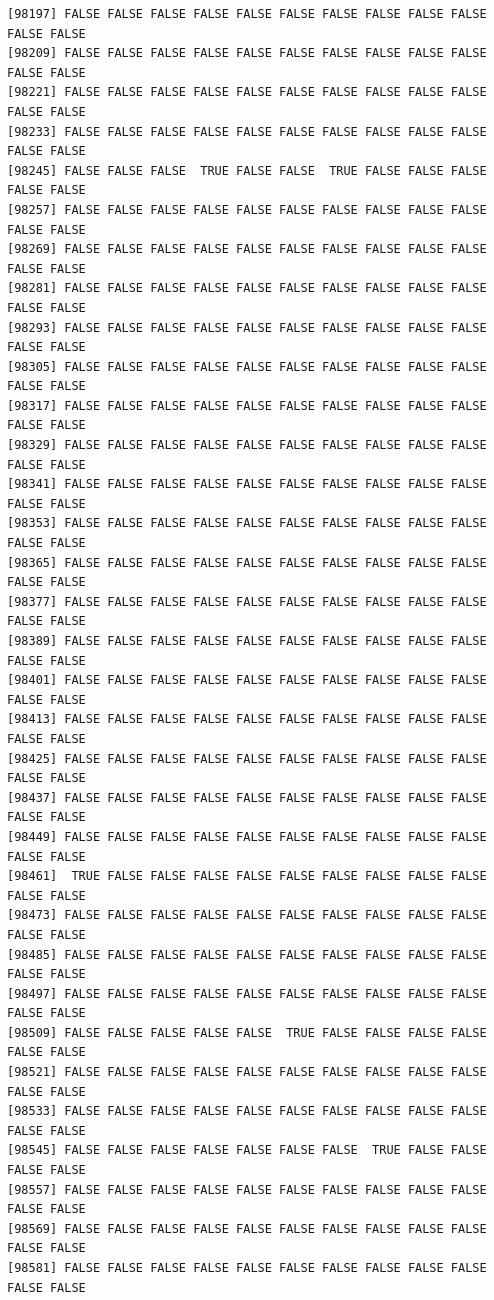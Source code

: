 \documentclass[
  a4paper,
  DIV=11,
  numbers=noendperiod]{scrartcl}
\begin{document}
\begin{verbatim}
[98197] FALSE FALSE FALSE FALSE FALSE FALSE FALSE FALSE FALSE FALSE FALSE FALSE
[98209] FALSE FALSE FALSE FALSE FALSE FALSE FALSE FALSE FALSE FALSE FALSE FALSE
[98221] FALSE FALSE FALSE FALSE FALSE FALSE FALSE FALSE FALSE FALSE FALSE FALSE
[98233] FALSE FALSE FALSE FALSE FALSE FALSE FALSE FALSE FALSE FALSE FALSE FALSE
[98245] FALSE FALSE FALSE  TRUE FALSE FALSE  TRUE FALSE FALSE FALSE FALSE FALSE
[98257] FALSE FALSE FALSE FALSE FALSE FALSE FALSE FALSE FALSE FALSE FALSE FALSE
[98269] FALSE FALSE FALSE FALSE FALSE FALSE FALSE FALSE FALSE FALSE FALSE FALSE
[98281] FALSE FALSE FALSE FALSE FALSE FALSE FALSE FALSE FALSE FALSE FALSE FALSE
[98293] FALSE FALSE FALSE FALSE FALSE FALSE FALSE FALSE FALSE FALSE FALSE FALSE
[98305] FALSE FALSE FALSE FALSE FALSE FALSE FALSE FALSE FALSE FALSE FALSE FALSE
[98317] FALSE FALSE FALSE FALSE FALSE FALSE FALSE FALSE FALSE FALSE FALSE FALSE
[98329] FALSE FALSE FALSE FALSE FALSE FALSE FALSE FALSE FALSE FALSE FALSE FALSE
[98341] FALSE FALSE FALSE FALSE FALSE FALSE FALSE FALSE FALSE FALSE FALSE FALSE
[98353] FALSE FALSE FALSE FALSE FALSE FALSE FALSE FALSE FALSE FALSE FALSE FALSE
[98365] FALSE FALSE FALSE FALSE FALSE FALSE FALSE FALSE FALSE FALSE FALSE FALSE
[98377] FALSE FALSE FALSE FALSE FALSE FALSE FALSE FALSE FALSE FALSE FALSE FALSE
[98389] FALSE FALSE FALSE FALSE FALSE FALSE FALSE FALSE FALSE FALSE FALSE FALSE
[98401] FALSE FALSE FALSE FALSE FALSE FALSE FALSE FALSE FALSE FALSE FALSE FALSE
[98413] FALSE FALSE FALSE FALSE FALSE FALSE FALSE FALSE FALSE FALSE FALSE FALSE
[98425] FALSE FALSE FALSE FALSE FALSE FALSE FALSE FALSE FALSE FALSE FALSE FALSE
[98437] FALSE FALSE FALSE FALSE FALSE FALSE FALSE FALSE FALSE FALSE FALSE FALSE
[98449] FALSE FALSE FALSE FALSE FALSE FALSE FALSE FALSE FALSE FALSE FALSE FALSE
[98461]  TRUE FALSE FALSE FALSE FALSE FALSE FALSE FALSE FALSE FALSE FALSE FALSE
[98473] FALSE FALSE FALSE FALSE FALSE FALSE FALSE FALSE FALSE FALSE FALSE FALSE
[98485] FALSE FALSE FALSE FALSE FALSE FALSE FALSE FALSE FALSE FALSE FALSE FALSE
[98497] FALSE FALSE FALSE FALSE FALSE FALSE FALSE FALSE FALSE FALSE FALSE FALSE
[98509] FALSE FALSE FALSE FALSE FALSE  TRUE FALSE FALSE FALSE FALSE FALSE FALSE
[98521] FALSE FALSE FALSE FALSE FALSE FALSE FALSE FALSE FALSE FALSE FALSE FALSE
[98533] FALSE FALSE FALSE FALSE FALSE FALSE FALSE FALSE FALSE FALSE FALSE FALSE
[98545] FALSE FALSE FALSE FALSE FALSE FALSE FALSE  TRUE FALSE FALSE FALSE FALSE
[98557] FALSE FALSE FALSE FALSE FALSE FALSE FALSE FALSE FALSE FALSE FALSE FALSE
[98569] FALSE FALSE FALSE FALSE FALSE FALSE FALSE FALSE FALSE FALSE FALSE FALSE
[98581] FALSE FALSE FALSE FALSE FALSE FALSE FALSE FALSE FALSE FALSE FALSE FALSE

\end{verbatim}
\end{document}
